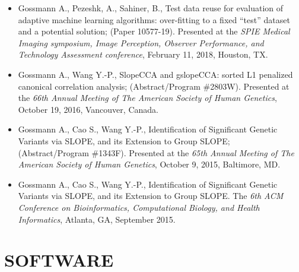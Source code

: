 \documentclass[overlapped, line, 10pt]{res} %
\begin{document}
\begin{resume}
\begin{itemize}
  \item
    Gossmann A., Pezeshk, A., Sahiner, B., Test data reuse for evaluation of adaptive machine learning algorithms: over-fitting to a fixed ``test'' dataset and a potential solution;
    (Paper 10577-19).
    Presented at the \textit{SPIE Medical Imaging symposium, Image Perception, Observer Performance, and Technology Assessment conference},
    February 11, 2018, Houston, TX.
  \item
    Gossmann A., Wang Y.-P., SlopeCCA and gslopeCCA: sorted L1 penalized canonical correlation analysis;
    (Abstract/Program \#2803W).
    Presented at the \textit{66th Annual Meeting of The American Society of Human Genetics},
    October 19, 2016, Vancouver, Canada.
  \item
    Gossmann A., Cao S., Wang Y.-P., Identification of Significant Genetic Variants via SLOPE, and its Extension to Group SLOPE;
    (Abstract/Program \#1343F).
    Presented at the \textit{65th Annual Meeting of The American Society of Human Genetics},
    October 9, 2015, Baltimore, MD.
  \item
    Gossmann A., Cao S., Wang Y.-P., Identification of Significant Genetic Variants via SLOPE, and its Extension to Group SLOPE.
    The \textit{6th ACM Conference on Bioinformatics, Computational Biology, and Health Informatics},
    Atlanta, GA, September 2015.
\end{itemize}


\section{SOFTWARE}


\end{resume}
\end{document}
